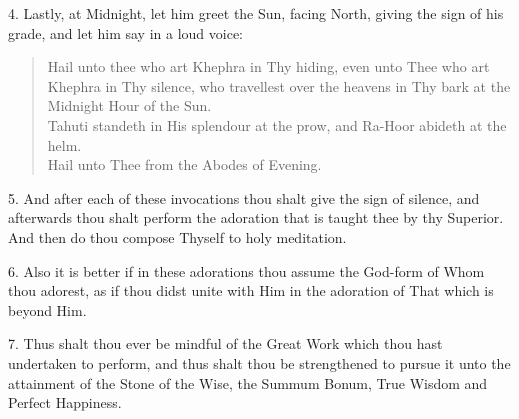 4. Lastly, at Midnight, let him greet the Sun, facing North, giving the sign of his grade, and let him say in a loud voice:
\begin{verse}
Hail unto thee who art Khephra in Thy hiding, even unto Thee who art Khephra in Thy silence, who travellest over the heavens in Thy bark at the Midnight Hour of the Sun. \\
Tahuti standeth in His splendour at the prow, and Ra-Hoor abideth at the helm. \\
Hail unto Thee from the Abodes of Evening.
\end{verse}

5. And after each of these invocations thou shalt give the sign of silence, and afterwards thou shalt perform the adoration that is taught thee by thy Superior. And then do thou compose Thyself to holy meditation.

6. Also it is better if in these adorations thou assume the God-form of Whom thou adorest, as if thou didst unite with Him in the adoration of That which is beyond Him.

7. Thus shalt thou ever be mindful of the Great Work which thou hast undertaken to perform, and thus shalt thou be strengthened to pursue it unto the attainment of the Stone of the Wise, the Summum Bonum, True Wisdom and Perfect Happiness.
